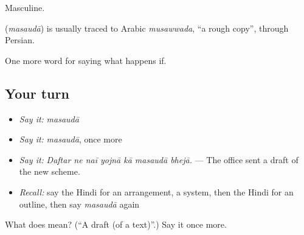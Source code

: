 Masculine.

\begin{cousinweb}
\textbf{} (\emph{masaudā}) is usually traced to Arabic \emph{musawwada}, \textquotedblleft{}a rough copy\textquotedblright{}, through Persian.
\end{cousinweb}

\begin{grammarlens}[title={What you've built}]
One more word for saying what happens if.
\end{grammarlens}

\subsection*{Your turn}
\begin{itemize}
\raggedright
  \item \emph{Say it:} \emph{masaudā}
  \item \emph{Say it:} \emph{masaudā}, once more
  \item \emph{Say it:} \emph{Daftar ne naī yojnā kā masaudā bhejā.} — The office sent a draft of the new scheme.
  \item \emph{Recall:} say the Hindi for an arrangement, a system, then the Hindi for an outline, then say \emph{masaudā} again
\end{itemize}

\begin{tcolorbox}[breakable,colback=teal!4,colframe=teal!35!black,title={Before you move on}]
What does  mean? (\textquotedblleft{}A draft (of a text)\textquotedblright{}.) Say it once more.
\end{tcolorbox}
